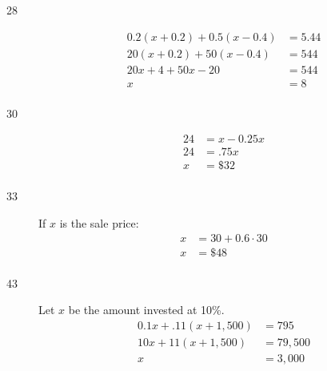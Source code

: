 \documentclass[letterpaper, landscape]{exam}
\begin{document}
\begin{description}
      \item[28]
        \begin{align*}
          0.2(x + 0.2) + 0.5(x - 0.4) & = 5.44 \\
          20(x + 0.2) + 50(x - 0.4)   & = 544 \\
          20x + 4 + 50x - 20          & = 544 \\
          x                           & = \boxed{ 8 } \\
        \end{align*}

      \item[30]
        \begin{align*}
          24 & = x - 0.25x \\
          24 & = .75x \\
          x  & = \boxed{ \$32 } \\
        \end{align*}

      \item[33] 
        If $x$ is the sale price:
        \begin{align*}
          x & = 30 + 0.6 \cdot 30 \\
          x & = \boxed{ \$48 } \\
        \end{align*}

      \item[43] Let $x$ be the amount invested at 10\%.
        \begin{align*}
          0.1x + .11(x + 1,500) & = 795 \\
          10x + 11(x + 1,500)   & = 79,500 \\
          x                    & = \boxed{ 3,000 } \\
        \end{align*}

      \end{description}
\end{document}

